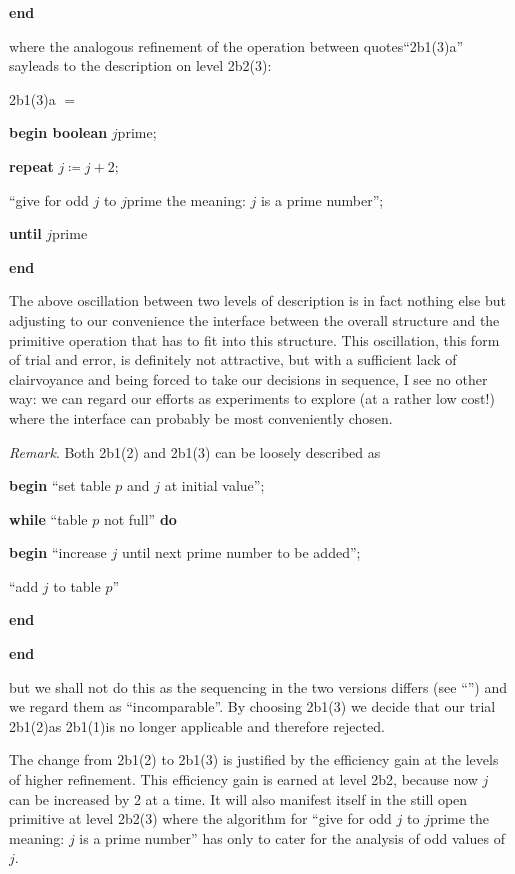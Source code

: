 \noindent
\textbf{end}

\noindent
where the analogous refinement of the operation between quotes\textemdash{}``2b1(3)a'' say\textemdash{}leads to the description on level 2b2(3):

\noindent
2b1(3)a $=$

\noindent
\textbf{begin boolean} $j$prime;

\noindent
\quad\textbf{repeat} $j \coloneq j + 2;$

\noindent
\quad\quad``give for odd $j$ to $j$prime the meaning: $j$ is a prime number'';

\noindent
\quad\textbf{until} $j$prime

\noindent
\textbf{end}

The above oscillation between two levels of description is in fact nothing else but adjusting to our convenience the interface between the overall structure and the primitive operation that has to fit into this structure. This oscillation, this form of trial and error, is definitely not attractive, but with a sufficient lack of clairvoyance and being forced to take our decisions in
sequence, I see no other way: we can regard our efforts as experiments to explore (at a rather low cost!) where the interface can probably be most conveniently chosen.

\noindent
\textit{Remark}. Both 2b1(2) and 2b1(3) can be loosely described as

\noindent
\textbf{begin} ``set table $p$ and $j$ at initial value'';

\noindent
\quad\textbf{while} ``table $p$ not full'' \textbf{do}

\noindent
\quad\textbf{begin} ``increase $j$ until next prime number to be added'';

\noindent
\quad\quad ``add $j$ to table $p$''

\noindent
\quad\textbf{end}

\noindent
\textbf{end}

\noindent
but we shall not do this as the sequencing in the two versions differs (see ``'') and we regard them as ``incomparable''. By choosing 2b1(3) we decide that our trial 2b1(2)\textemdash{}as 2b1(1)\textemdash{}is no longer applicable and therefore rejected.

The change from 2b1(2) to 2b1(3) is justified by the efficiency gain at the levels of higher refinement. This efficiency gain is earned at level 2b2, because now $j$ can be increased by 2 at a time. It will also manifest itself in the still open primitive at level 2b2(3) where the algorithm for ``give for odd $j$ to $j$prime the meaning: $j$ is a prime number'' has only to cater for the analysis of odd values of $j$.

